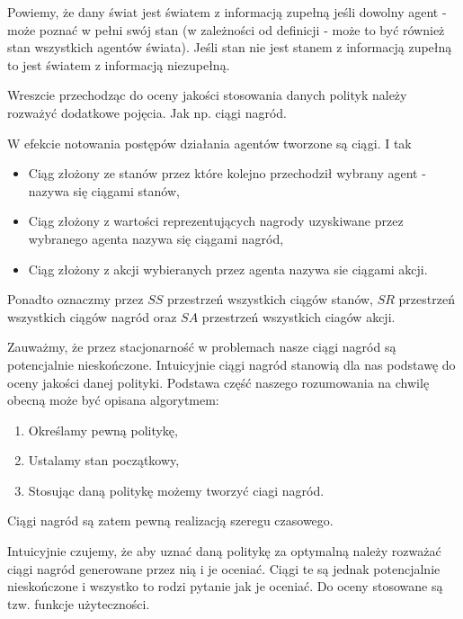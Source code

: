 \documentclass[10pt,a4paper]{book}
\begin{document}
\begin{definition}
Powiemy, że dany świat jest światem z informacją zupełną jeśli dowolny agent - może poznać w pełni swój stan (w zależności od definicji - może to być również stan wszystkich agentów świata). Jeśli stan nie jest stanem z informacją zupełną to jest światem z informacją niezupełną. 
\end{definition}

Wreszcie przechodząc do oceny jakości stosowania danych polityk należy rozważyć dodatkowe pojęcia. Jak np. ciągi nagród.

\begin{definition}
W efekcie notowania postępów działania agentów tworzone są ciągi.
I tak
\begin{itemize}
\item Ciąg złożony ze stanów przez które kolejno przechodził wybrany agent - nazywa się ciągami stanów,
\item Ciąg złożony z wartości reprezentujących nagrody uzyskiwane przez wybranego agenta nazywa się ciągami nagród,
\item Ciąg złożony z akcji wybieranych przez agenta nazywa sie ciągami akcji.
\end{itemize}
Ponadto oznaczmy przez $SS$ przestrzeń wszystkich ciągów stanów, $SR$ przestrzeń wszystkich ciągów nagród oraz $SA$ przestrzeń wszystkich ciagów akcji.
\end{definition}

Zauważmy, że przez stacjonarność w problemach nasze ciągi nagród są potencjalnie nieskończone. Intuicyjnie ciągi nagród stanowią dla nas podstawę do oceny jakości danej polityki. Podstawa część naszego rozumowania na chwilę obecną może być opisana algorytmem:

\begin{enumerate}
\item Określamy pewną politykę, 
\item Ustalamy stan początkowy,
\item Stosując daną politykę możemy tworzyć ciagi nagród.
\end{enumerate}


\begin{remark*}
Ciągi nagród są zatem pewną realizacją szeregu czasowego.
\end{remark*}

Intuicyjnie czujemy, że aby uznać daną politykę za optymalną należy rozważać ciągi nagród generowane przez nią i je oceniać. Ciągi te są jednak potencjalnie nieskończone i wszystko to rodzi pytanie jak je oceniać. Do oceny stosowane są tzw. funkcje użyteczności.
\end{document}
